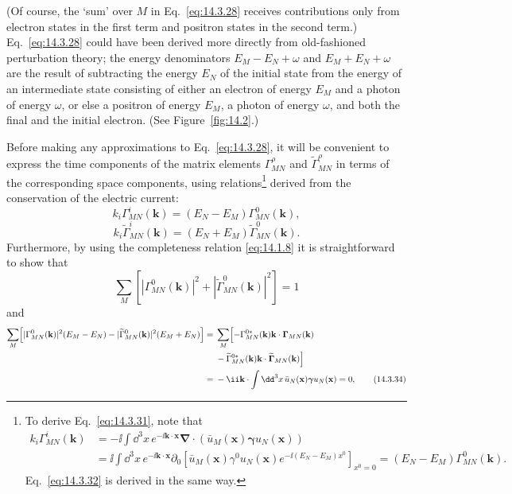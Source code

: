 (Of course, the `sum' over $M$ in Eq.~\eqref{eq:14.3.28} receives
contributions only from electron states in the first term and positron states
in the second term.) Eq.~\eqref{eq:14.3.28} could have been derived more
directly from old-fashioned perturbation theory; the energy denominators
$E_M-E_N+\omega$ and $E_M+E_N+\omega$ are the result of subtracting the energy
$E_N$ of the initial state from the energy of an intermediate state consisting
of either an electron of energy $E_M$ and a photon of energy $\omega$, or else
a positron of energy $E_M$, a photon of energy $\omega$, and both the final and
the initial electron. (See Figure~\ref{fig:14.2}.)



Before making any approximations to Eq.~\eqref{eq:14.3.28}, it will be
convenient to express the time components of the matrix elements
$\Gamma_{MN}^\rho$ and $\widetilde\Gamma_{MN}^\rho$ in terms of the
corresponding space components, using relations\footnote{To derive
Eq.~\eqref{eq:14.3.31}, note that
\begin{align*}
k_i\Gamma_{MN}^i(\mathbf k)
&=-\ii\int \dd^3x\,e^{-\ii\mathbf k\cdot\mathbf x}
\boldsymbol\nabla\cdot(\bar u_M(\mathbf x)\boldsymbol\gamma u_N(\mathbf x))\\
&=\ii\int \dd^3x\,e^{-\ii\mathbf k\cdot\mathbf x}
\partial_0\left[\bar u_M(\mathbf x)\gamma^0u_N(\mathbf x)
e^{-\ii(E_N-E_M)x^0}\right]_{x^0=0}
=(E_N-E_M)\Gamma_{MN}^0(\mathbf k).
\end{align*}
Eq.~\eqref{eq:14.3.32} is derived in the same way.} derived from the
conservation of the electric current:
\begin{equation}
k_i\Gamma_{MN}^i(\mathbf k)=(E_N-E_M)\Gamma_{MN}^0(\mathbf k),
\tag{14.3.31}\label{eq:14.3.31}
\end{equation}
\begin{equation}
k_i\widetilde\Gamma_{MN}^i(\mathbf k)
=(E_N+E_M)\widetilde\Gamma_{MN}^0(\mathbf k).
\tag{14.3.32}\label{eq:14.3.32}
\end{equation}
Furthermore, by using the completeness relation \eqref{eq:14.1.8} it is
straightforward to show that
\begin{equation}
\sum_M\left[|\Gamma_{MN}^0(\mathbf k)|^2
+|\widetilde\Gamma_{MN}^0(\mathbf k)|^2\right]=1
\tag{14.3.33}\label{eq:14.3.33}
\end{equation}
and
\begin{align}
\sum_M\Bigl[|\Gamma_{MN}^0(\mathbf k)|^2(E_M-E_N)
-|\widetilde\Gamma_{MN}^0(\mathbf k)|^2(E_M+E_N)\Bigr]
={}&\sum_M\Bigl[-\Gamma_{MN}^{0*}(\mathbf k)
\mathbf k\cdot\boldsymbol\Gamma_{MN}(\mathbf k)\notag\\
&-\widetilde\Gamma_{MN}^{0*}(\mathbf k)
\mathbf k\cdot\widetilde{\boldsymbol\Gamma}_{MN}(\mathbf k)\Bigr]
\notag\\
={}&-\ii\mathbf k\cdot\int \dd^3x\,\bar u_N(\mathbf x)
\boldsymbol\gamma u_N(\mathbf x)=0,
\tag{14.3.34}\label{eq:14.3.34}
\end{align}
